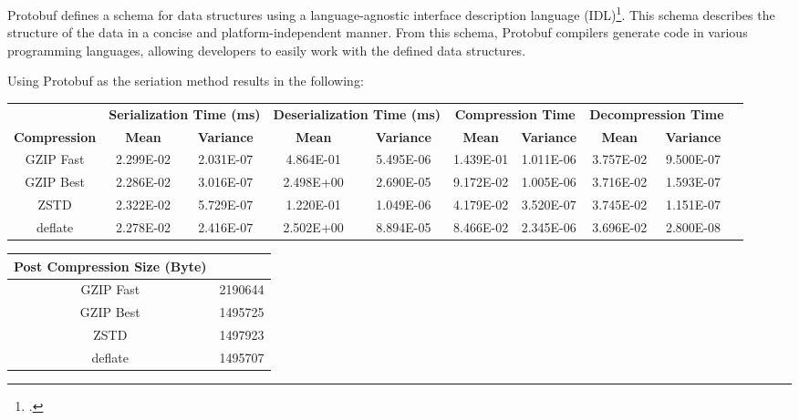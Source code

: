 Protobuf defines a schema for data structures using a language-agnostic interface description language (IDL)\footcite{idl}. This schema describes the structure of the data in a concise and platform-independent manner. From this schema, Protobuf compilers generate code in various programming languages, allowing developers to easily work with the defined data structures.

Using Protobuf as the seriation method results in the following:

\begin{table}[H]
\scriptsize
\centering
\begin{tabular}{cccccccccc}
\hline
 &
  \multicolumn{2}{c}{\textbf{Serialization Time (ms)}} &
  \multicolumn{2}{c}{\textbf{Deserialization Time (ms)}} &
  \multicolumn{2}{c}{\textbf{Compression Time}} &
  \multicolumn{2}{c}{\textbf{Decompression Time}} &
   \\
\textbf{Compression} & \textbf{Mean}     & \textbf{Variance} & \textbf{Mean}     & \textbf{Variance} & \textbf{Mean}     & \textbf{Variance} & \textbf{Mean}     & \textbf{Variance} \\
\hline
GZIP Fast           & 2.299E-02 & 2.031E-07 & 4.864E-01 & 5.495E-06 & 1.439E-01 & 1.011E-06 & 3.757E-02 & 9.500E-07  \\
GZIP Best           & 2.286E-02 & 3.016E-07 & 2.498E+00 & 2.690E-05 & 9.172E-02 & 1.005E-06 & 3.716E-02 & 1.593E-07  \\
ZSTD                & 2.322E-02 & 5.729E-07 & 1.220E-01 & 1.049E-06 & 4.179E-02 & 3.520E-07 & 3.745E-02 & 1.151E-07  \\
deflate             & 2.278E-02 & 2.416E-07 & 2.502E+00 & 8.894E-05 & 8.466E-02 & 2.345E-06 & 3.696E-02 & 2.800E-08  \\
\hline
\end{tabular}
\end{table}

\begin{table}[H]
  \scriptsize
  \centering
  \begin{tabular}{cc}
  \hline
  \textbf{Post Compression Size (Byte)} \\
  \hline
  GZIP Fast           & 2190644 \\
  GZIP Best           & 1495725 \\
  ZSTD                & 1497923 \\
  deflate             & 1495707 \\
  \hline
  \end{tabular}
  \end{table}

